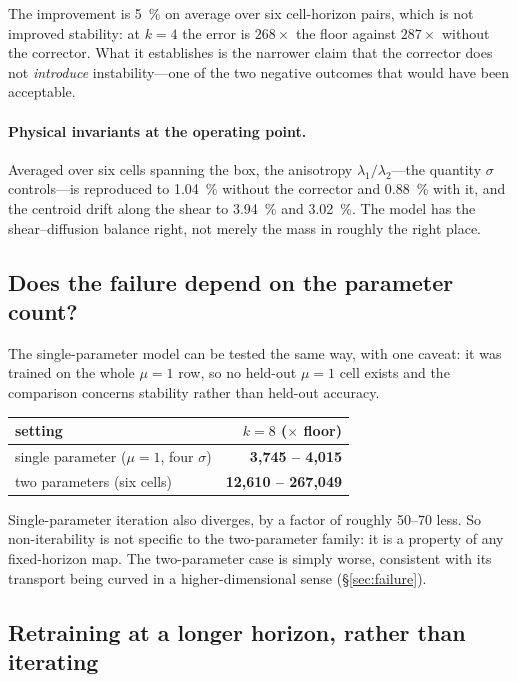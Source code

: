 ﻿\documentclass[11pt,a4paper]{article}
\begin{document}
The improvement is \SI{5}{\percent} on average over six cell-horizon pairs, which is not improved
stability: at $k=4$ the error is $268\times$ the floor against $287\times$ without the corrector.
What it establishes is the narrower claim that the corrector does not \emph{introduce}
instability---one of the two negative outcomes that would have been acceptable.

\paragraph{Physical invariants at the operating point.} Averaged over six cells spanning the box,
the anisotropy $\lambda_1/\lambda_2$---the quantity $\sigma$ controls---is reproduced to
\SI{1.04}{\percent} without the corrector and \SI{0.88}{\percent} with it, and the centroid drift
along the shear to \SI{3.94}{\percent} and \SI{3.02}{\percent}. The model has the shear--diffusion
balance right, not merely the mass in roughly the right place.

\subsection{Does the failure depend on the parameter count?}

The single-parameter model can be tested the same way, with one caveat: it was trained on the whole
$\mu=1$ row, so no held-out $\mu=1$ cell exists and the comparison concerns stability rather than
held-out accuracy.

\begin{table}[h]
\centering\small
\begin{tabular}{@{}lr@{}}
\toprule
setting & $k{=}8$ ($\times$ floor) \\
\midrule
single parameter ($\mu{=}1$, four $\sigma$) & \textbf{3{,}745 -- 4{,}015} \\
two parameters (six cells) & \textbf{12{,}610 -- 267{,}049} \\
\bottomrule
\end{tabular}
\end{table}

Single-parameter iteration also diverges, by a factor of roughly 50--70 less. So non-iterability is
not specific to the two-parameter family: it is a property of any fixed-horizon map. The
two-parameter case is simply worse, consistent with its transport being curved in a
higher-dimensional sense (\S\ref{sec:failure}).

\subsection{Retraining at a longer horizon, rather than iterating}
\end{document}
